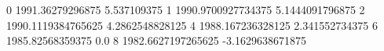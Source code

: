 0 1991.36279296875 5.537109375
1 1990.9700927734375 5.1444091796875
2 1990.1119384765625 4.2862548828125
4 1988.167236328125 2.341552734375
6 1985.82568359375 0.0
8 1982.6627197265625 -3.1629638671875

